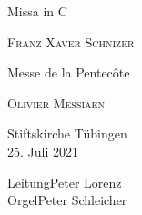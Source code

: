 \documentclass[a5paper,twoside=false,fontsize=11pt, DIV=14]{scrartcl}
\title{}
\author{}
\begin{document}
    \begin{titlepage}
        \begin{center}
            \vspace*{1.5cm}
            
            \begin{minipage}{\widthof{{\Huge Messe de la Pentecôte }}}
                {\Huge Missa in C}
                \bigskip
                
                \textsc{\LARGE Franz Xaver Schnizer}
                \vspace{1cm}
                
                {\Huge Messe de la Pentecôte}
                \bigskip
                
                \textsc{\LARGE Olivier Messiaen}
                
                \vspace*{3cm}
                
                {\Large Stiftskirche Tübingen\\[0.8ex] 25. Juli 2021}
                \vspace{2.5ex}
                
                Leitung\quad Peter Lorenz\\
                Orgel\quad Peter Schleicher
            \end{minipage}
        \vfill
%                
            
%                
        \end{center}
    \end{titlepage}
\end{document}
